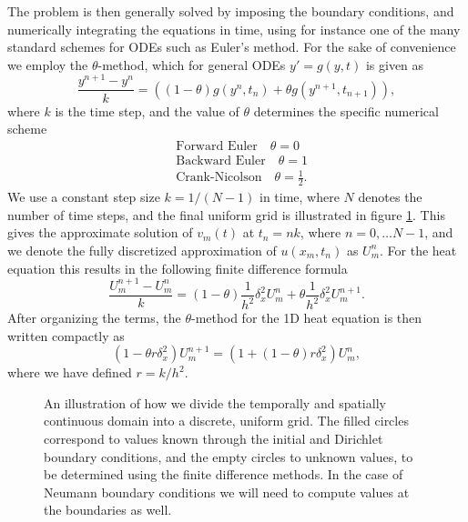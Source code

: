 The problem is then generally solved by imposing the boundary conditions, 
and numerically integrating the equations in time, 
using for instance one of the many standard schemes for ODEs such as Euler's method. 
For the sake of convenience we employ the $\theta$-method, 
which for general ODEs $y' = g(y, t)$ is given as
\begin{equation*}
    \frac{y^{n+1} - y^n}{k} = \left((1-\theta)g(y^n, t_n)+\theta g(y^{n+1}, t_{n+1})\right), 
\end{equation*}
where $k$ is the time step, and the value of $\theta$ determines the specific numerical scheme 
\begin{align*}
    & \text{Forward Euler} \quad \theta = 0 \\
    & \text{Backward Euler} \quad \theta = 1 \\
    & \text{Crank-Nicolson} \quad \theta = \frac{1}{2}.
\end{align*}
We use a constant step size $k = 1/(N-1)$ in time, 
where $N$ denotes the number of time steps, 
and the final uniform grid is illustrated in figure \ref{fig:2-uniform-grid}. 
This gives the approximate solution of $v_m(t)$ at $t_n = nk$, 
where $n = 0, \ldots N-1$, 
and we denote the fully discretized approximation of $u(x_m, t_n)$ as $U_{m}^{n}$. 
For the heat equation  this results in the following finite difference formula
\begin{equation} 
    \frac{U_m^{n+1} - U_m^n}{k} = (1-\theta)\frac{1}{h^2}\delta_x^2 U_m^n + \theta\frac{1}{h^2}\delta_x^2 U_m^{n+1}. 
    \label{eq:theta-heat-raw}
\end{equation}
After organizing the terms, 
the $\theta$-method for the 1D heat equation is then written compactly as 
\begin{equation}
    (1 - \theta r \delta_x^2)U_m^{n+1} = \left(1 + (1-\theta)r\delta_x^2\right)U_m^n, 
    \label{eq:theta-heat}
\end{equation}
where we have defined $r=k/h^2$. 
\begin{figure}[ht!]
    \centering
    
    \caption{An illustration of how we divide the temporally and spatially continuous domain into a discrete, uniform grid. The filled circles correspond to values known through the initial and Dirichlet boundary conditions, and the empty circles to unknown values, to be determined using the finite difference methods. In the case of Neumann boundary conditions we will need to compute values at the boundaries as well.}
    \label{fig:2-uniform-grid}
\end{figure}

